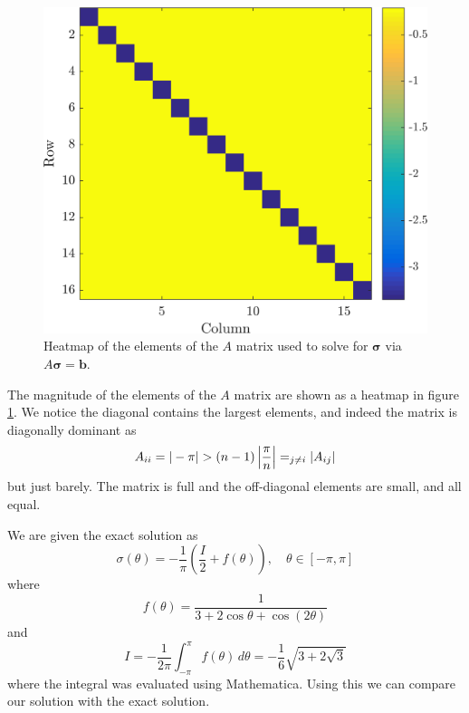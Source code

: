 \documentclass[11pt]{article}
\let\sumop\relax
\begin{document}
\begin{figure}[!htb]
  \centering
  \includegraphics[width=0.7\linewidth]{matrix_heatmap.png}
  \caption{Heatmap of the elements of the $A$ matrix used to solve for $\bm{\sigma}$ via $A\bm{\sigma} = \bm{b}$.}
  \label{fig:matrix_heatmap}
\end{figure}

The magnitude of the elements of the $A$ matrix are shown as a heatmap in figure \ref{fig:matrix_heatmap}. We notice the diagonal contains the largest elements, and indeed the matrix is diagonally dominant as
\begin{equation*}
A_{ii} = |-\pi| > (n-1)\left\lvert \frac{\pi}{n} \right\rvert = \sumop_{j\ne i} |A_{ij}|
\end{equation*}
but just barely. The matrix is full and the off-diagonal elements are small, and all equal.

We are given the exact solution as
\begin{equation}
  \sigma(\theta) = -\frac{1}{\pi} \left( \frac{I}{2} + f(\theta) \right), \quad \theta \in [-\pi, \pi]
\end{equation}
where 
\begin{equation}
  f(\theta) = \frac{1}{3 + 2\cos\theta + \cos(2\theta)}
\end{equation}
and
\begin{equation*}
  I = - \frac{1}{2\pi} \int_{-\pi}^\pi f(\theta) \, d\theta
  = -\frac{1}{6} \sqrt{3 + 2\sqrt{3}}
\end{equation*}
where the integral was evaluated using Mathematica. Using this we can compare our solution with the exact solution.
\end{document}
